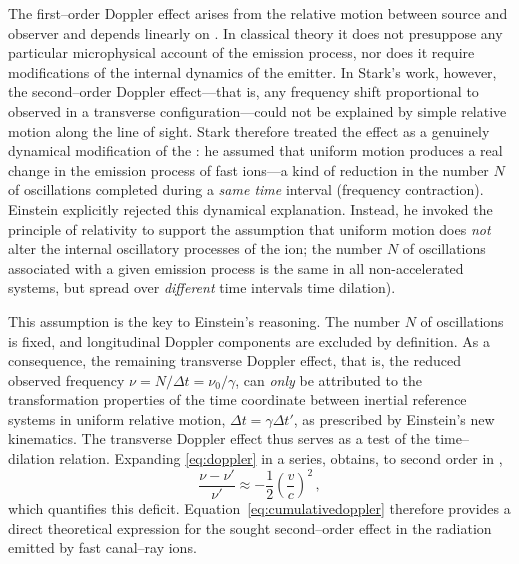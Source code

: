 \documentclass[pdflatex,sn-basic]{sn-jnl}
\newcommand{\tDe}{transverse Doppler effect\xspace}
\begin{document}

The first--order Doppler effect arises from the relative motion between source and observer and depends linearly on \betafactorh. In classical theory it does not presuppose any particular microphysical account of the emission process, nor does it require modifications of the internal dynamics of the emitter. In Stark’s work, however, the second--order Doppler effect—that is, any frequency shift proportional to \betafactorsquaredh observed in a transverse configuration—could not be explained by simple relative motion along the line of sight. Stark therefore treated the effect as a genuinely dynamical modification of the : he assumed that uniform motion produces a real change in the emission process of fast ions---a kind of reduction in the number $N$ of oscillations completed during a \emph{same time} interval (frequency contraction). Einstein explicitly rejected this dynamical explanation. Instead, he invoked the principle of relativity to support the assumption that uniform motion does \emph{not} alter the internal oscillatory processes of the ion; the number $N$ of oscillations associated with a given emission process is the same in all non-accelerated systems, but spread over \emph{different} time intervals time dilation). 

This assumption is the key to Einstein’s reasoning. The number $N$ of oscillations is fixed, and longitudinal Doppler components are excluded by definition. As a consequence, the remaining transverse Doppler effect, that is, the reduced observed frequency $\nu = N/\Delta t = \nu_0/\gamma$, can \emph{only} be attributed to the transformation properties of the time coordinate between inertial reference systems in uniform relative motion, $\Delta t=\gamma\Delta t'$, as prescribed by Einstein’s new kinematics. The \tDe thus serves as a test of the time--dilation relation. Expanding \cref{eq:doppler} in a series, \citet[197]{Einstein1907d} obtains, to second order in \betafactorh,
%
\begin{equation}\label{eq:cumulativedoppler}
\frac{\nu-\nu'}{\nu'} \approx -\frac{1}{2}\left(\frac{v}{c}\right)^2\,,
\end{equation}
%
which quantifies this deficit. Equation~\eqref{eq:cumulativedoppler} therefore provides a direct theoretical expression for the sought second--order effect in the radiation emitted by fast canal--ray ions. 
\end{document}
